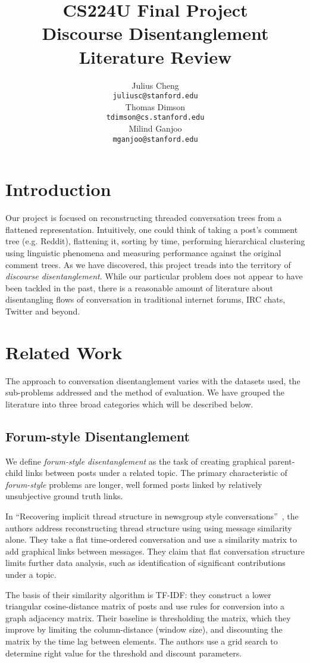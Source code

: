 \documentclass[11pt]{article}
\title{{\small CS224U Final Project} \\ Discourse Disentanglement \\Literature Review}
\author{Julius Cheng \\
  {\tt juliusc@stanford.edu}
  \\\And
  Thomas Dimson  \\
  {\tt tdimson@cs.stanford.edu}
  \\\AND
  Milind Ganjoo \\
  {\tt mganjoo@stanford.edu}
}
\date{}
\newcommand{\titlecite}[2]{``#1''~\cite{#2}}
\begin{document}
\maketitle

\section{Introduction}
Our project is focused on reconstructing threaded conversation trees
from a flattened representation. Intuitively, one could think of 
taking a post's comment tree (e.g. Reddit), flattening it, sorting by time, performing
hierarchical clustering using linguistic phenomena and measuring performance 
against the original comment trees. As we have
discovered, this project treads into the territory of \textit{discourse disentanglement}.
While our particular problem does not appear to have been tackled in the past,
there is a reasonable amount of literature about disentangling flows of conversation
in traditional internet forums, IRC chats, Twitter and beyond.

\section{Related Work}
The approach to conversation disentanglement varies with the datasets used, the 
sub-problems addressed and the method of evaluation. We have grouped the literature into
three broad categories which will be described below.

\subsection{Forum-style Disentanglement}
\label{sec:threaded}
We define \textit{forum-style disentanglement} as the task of creating 
graphical parent-child links between posts under a related topic. The primary characteristic 
of \textit{forum-style} problems are longer, well formed posts 
linked by relatively unsubjective ground truth links.

In \titlecite{Recovering implicit thread structure in newsgroup style conversations}{Wang2008a}, 
the authors address reconstructing thread structure using using 
message similarity alone. They take a flat
time-ordered conversation and use a similarity matrix to add graphical
links between messages. They claim that flat conversation structure
limits further data analysis, such as identification of significant
contributions under a topic. 

The basis of their similarity algorithm is TF-IDF: they
construct a lower triangular cosine-distance matrix of posts and use rules 
for conversion into a graph adjacency matrix. Their baseline is thresholding the
matrix, which they improve by limiting the column-distance (window size), and discounting
the matrix by the time lag between elements. The authors use a grid search to
determine right value for the threshold and discount parameters.
\end{document}
